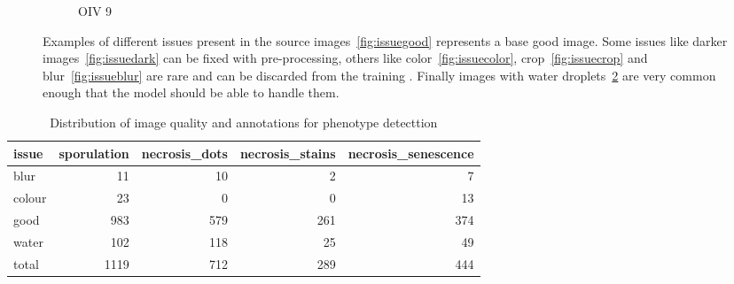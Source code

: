 \documentclass[english]{article}
\begin{document}
\begin{figure}[H]
\begin{subfigure}[b]{0.3\linewidth}
        \caption{OIV 9}\label{fig:issuewater}
    \end{subfigure}
    \caption{Examples of different issues present in the source images~\ref{fig:issuegood} represents a base good image. Some issues like darker images~\ref{fig:issuedark} can be fixed with pre-processing, others like color~\ref{fig:issuecolor}, crop~\ref{fig:issuecrop} and blur~\ref{fig:issueblur} are rare and can be discarded from the training . Finally images with water droplets~\ref{fig:issuewater} are very common enough that the model should be able to handle them.}
\end{figure}

\begin{table}[H]
\centering
\caption{Distribution of image quality and annotations for phenotype detecttion}
\label{tab:databincount}
\begin{tabular}{lrrrr}
\toprule
 issue &  sporulation &  necrosis\_dots &  necrosis\_stains &  necrosis\_senescence \\
\midrule
  blur &           11 &             10 &                2 &                    7 \\
colour &           23 &              0 &                0 &                   13 \\
  good &          983 &            579 &              261 &                  374 \\
 water &          102 &            118 &               25 &                   49 \\
 total &         1119 &            712 &              289 &                  444 \\
\bottomrule
\end{tabular}
\end{table}
\end{document}
